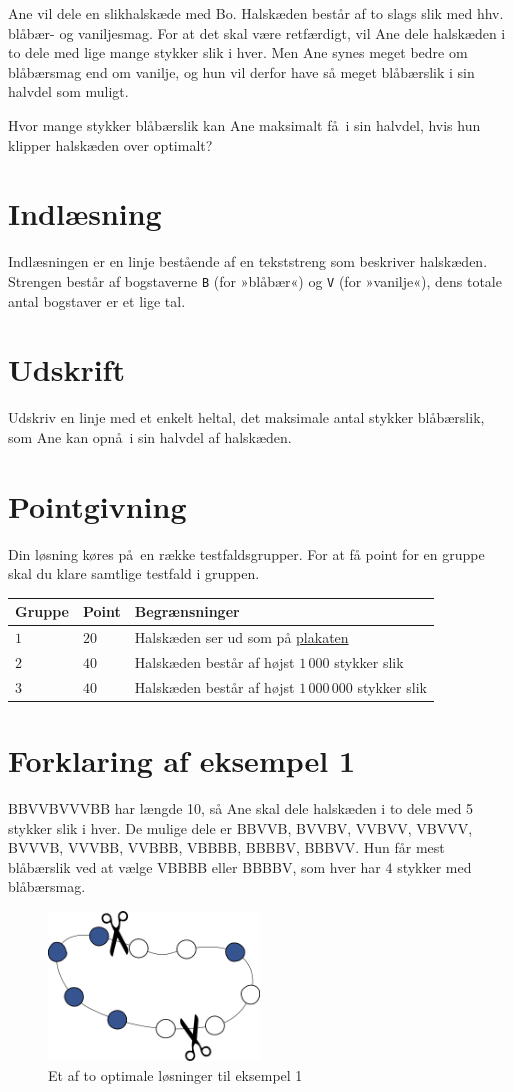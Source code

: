 Ane vil dele en slikhalskæde med Bo.
Halskæden består af to slags slik med hhv. blåbær- og vaniljesmag.
For at det skal være retfærdigt, vil Ane dele halskæden i to dele med lige mange stykker slik i hver.
Men Ane synes meget bedre om blåbærsmag end om vanilje, og hun vil derfor have så meget blåbærslik i sin halvdel som muligt.

Hvor mange stykker blåbærslik kan Ane maksimalt få i sin halvdel, hvis hun klipper halskæden over optimalt?

\section*{Indlæsning}
Indlæsningen er en linje bestående af en tekststreng som beskriver halskæden.
Strengen består af bogstaverne \texttt{B} (for »blåbær«) og \texttt{V} (for »vanilje«), dens totale antal bogstaver er et lige tal.

\section*{Udskrift}
Udskriv en linje med et enkelt heltal, det maksimale antal stykker blåbærslik, som Ane kan opnå i sin halvdel af halskæden.

\section*{Pointgivning}

Din løsning køres på en række testfaldsgrupper.
For at få point for en gruppe skal du klare samtlige testfald i gruppen.

\noindent
\begin{tabular}{| l | l | l |}
\hline
Gruppe & Point & Begrænsninger \\ \hline
$1$   & $20$       & Halskæden ser ud som på \href{https://www.progolymp.se/2020/affisch.pdf}{plakaten} \\ \hline
$2$   & $40$       & Halskæden består af højst $1\,000$ stykker slik\\ \hline
$3$   & $40$       & Halskæden består af højst $1\,000\,000$ stykker slik \\ \hline
\end{tabular}

\section*{Forklaring af eksempel 1}
BBVVBVVVBB har længde 10, så Ane skal dele halskæden i to dele med 5 stykker slik i hver.
De mulige dele er BBVVB, BVVBV, VVBVV, VBVVV, BVVVB, VVVBB, VVBBB, VBBBB, BBBBV, BBBVV.
Hun får mest blåbærslik ved at vælge VBBBB eller BBBBV, som hver har $4$ stykker med blåbærsmag.

\begin{figure}[h]
	\centering
\includegraphics[width=0.5\textwidth]{sample1}
\caption{Et af to optimale løsninger til eksempel 1}
\end{figure}
